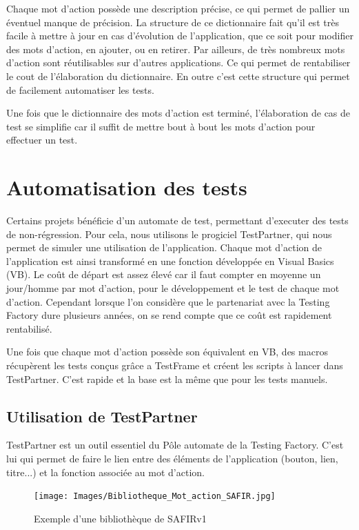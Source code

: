 Chaque mot d'action possède une description précise, ce qui permet de pallier un éventuel manque de précision. La structure de ce dictionnaire fait qu'il est très facile à mettre à jour en cas d'évolution de l'application, que ce soit pour modifier des mots d'action, en ajouter, ou en retirer. Par ailleurs, de très nombreux mots d'action sont réutilisables sur d'autres applications. Ce qui permet de rentabiliser le cout de l'élaboration du dictionnaire. En outre c'est cette structure qui permet de facilement automatiser les tests.

Une fois que le dictionnaire des mots d'action est terminé, l'élaboration de cas de test se simplifie car il suffit de mettre bout à bout les mots d'action pour effectuer un test.

\section{Automatisation des tests}

Certains projets bénéficie d'un automate de test, permettant d'executer des tests de non-régression. Pour cela, nous utilisons le progiciel TestPartner, qui nous permet de simuler une utilisation de l'application.
Chaque mot d'action de l'application est ainsi transformé en une fonction développée en Visual Basics (VB). Le coût de départ est assez élevé car il faut compter en moyenne un jour/homme par mot d'action, pour le développement et le test de chaque mot d'action. Cependant lorsque l'on considère que le partenariat avec la Testing Factory dure plusieurs années, on se rend compte que ce coût est rapidement rentabilisé.

Une fois que chaque mot d'action possède son équivalent en VB, des macros récupèrent les tests conçus grâce a TestFrame et créent les scripts à lancer dans TestPartner. C'est rapide et la base est la même que pour les tests manuels.

\subsection{Utilisation de TestPartner}

TestPartner est un outil essentiel du Pôle automate de la Testing Factory. C'est lui qui permet de faire le lien entre des éléments de l'application (bouton, lien, titre...) et la fonction associée au mot d'action.
\begin{figure}[h]
  \begin{center}
    \texttt{[image: Images/Bibliotheque\_Mot\_action\_SAFIR.jpg]}
  \end{center}
  \caption{Exemple d'une bibliothèque de SAFIRv1}
  \label{Exemple d'une bibliothèque de SAFIRv1}
\end{figure}


